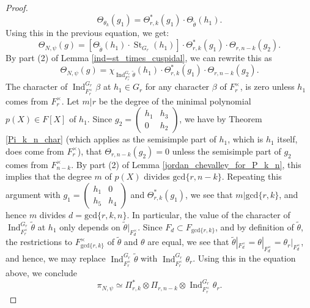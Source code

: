 \documentclass[reqno]{amsart}
\theoremstyle{definition}
\theoremstyle{remark}
\numberwithin{equation}{section}
\DeclareMathOperator{\Ind}{Ind}
\DeclareMathOperator{\St}{St}
\newcommand{\bbsm}{\left (\begin{smallmatrix}}      \newcommand{\besm}{\end{smallmatrix}\right )}
\begin{document}
{{\begin{proof}
\[    \Theta_{\theta_k}(g_1)= \Theta^*_{r,k}(g_1) \cdot \Theta_{\tilde\theta}(h_1).\]
Using this in the previous equation, we get:
\[ \Theta_{N, \psi}(g) = \left[ \Theta_{\tilde\theta}(h_1) \cdot \St_{G_r}(h_1) \right] \cdot \Theta^*_{r,k}(g_1)  \cdot \Theta_{r,n-k}(g_2). \]
By part (2) of Lemma \ref{ind=st_times_cuspidal}, we can rewrite this as
\[ \Theta_{N, \psi}(g) = \chi_{\Ind_{F_r^\times}^{G_r} \tilde\theta}(h_1)   \cdot \Theta^*_{r,k}(g_1)  \cdot \Theta_{r,n-k}(g_2). \]
The character of $\Ind_{F_r^\times}^{G_r} \beta$ at $h_1 \in G_r$ for any character $\beta$ of $F_r^\times$, is zero unless $h_1$ comes from $F_r^\times$. Let $m|r$ be the degree of the   minimal polynomial $p(X)\in F[X]$ of $h_1$. Since $g_2=\bbsm
    h_1& h_3\\0&h_2 \besm$, we have by Theorem \ref{Pi_k_n_char} (which applies as the semisimple part of $h_1$, which is $h_1$ itself, does come from $F_r^\times$), that $\Theta_{r,n-k}(g_2)=0$ unless the semisimple part of $g_2$ comes from $F_{n-k}^\times$. By part (2) of Lemma \ref{jordan_chevalley_for_P_k_n}, this implies that the degree $m$ of $p(X)$ divides $\text{gcd}\{r,n-k\}$. Repeating this argument with 
    $g_1=\bbsm h_1 &  0\\
    h_5 & h_4\besm$ and $\Theta^*_{r,k}(g_1)$, we see that $m| \text{gcd}\{r,k\}$, and hence $m$ divides $d=\text{gcd}\{r,k,n\}$.
In particular, the value of  the character of $\Ind_{F_r^\times}^{G_r} \tilde\theta$ at $h_1$ only depends on $ \tilde\theta|_{F_d^\times}$. Since $F_d \subset F_{\text{gcd}\{r,k\}}$,  and by definition of $\tilde\theta$, the restrictions to $F_{\text{gcd}\{r,k\}}^\times$ of $\tilde\theta$ and $\theta$ are equal, we see that $ \tilde\theta|_{F_d^\times}=\theta|_{F_d^\times}=\theta_r|_{F_d^\times}$, and hence, we may replace 
$\Ind_{F_r^\times}^{G_r} \tilde\theta$ with $\Ind_{F_r^\times}^{G_r} \theta_r$. Using this in the equation above, we conclude 
\[ \pi_{N, \psi} \simeq \Pi^*_{r,k} \otimes \Pi_{r,n-k} \otimes \Ind_{F_r^\times}^{G_r} \theta_r.\]
\end{proof}



}}
\end{document}
